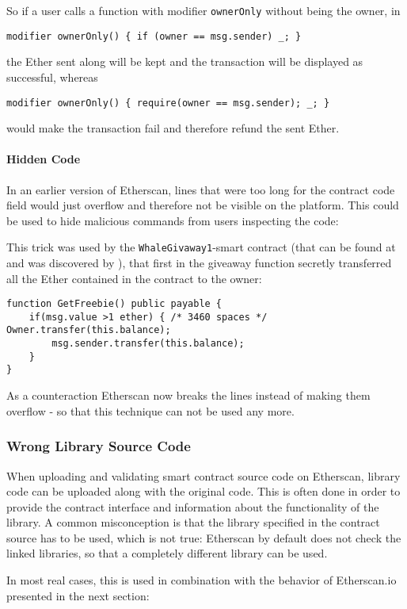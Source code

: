 So if a user calls a function with modifier \texttt{ownerOnly} without being the owner, in
\begin{verbatim}
modifier ownerOnly() { if (owner == msg.sender) _; }
\end{verbatim}
the Ether sent along will be kept and the transaction will be displayed as successful, whereas
\begin{verbatim}
modifier ownerOnly() { require(owner == msg.sender); _; }
\end{verbatim}
would make the transaction fail and therefore refund the sent Ether.

\paragraph{Hidden Code}
In an earlier version of Etherscan, lines that were too long for the contract code field would just overflow and therefore not be visible on the platform. This could be used to hide malicious commands from users inspecting the code:

This trick was used by the \texttt{WhaleGivaway1}-smart contract (that can be found at \cite{etherscan:whalegiveaway} and was discovered by \cite{wagner:honeypots}), that first in the giveaway function secretly transferred all the Ether contained in the contract to the owner:
\begin{verbatim}
function GetFreebie() public payable {
    if(msg.value >1 ether) { /* 3460 spaces */ Owner.transfer(this.balance);
        msg.sender.transfer(this.balance);
    }
}
\end{verbatim}

As a counteraction Etherscan now breaks the lines instead of making them overflow - so that this technique can not be used any more.

\subsubsection{Wrong Library Source Code}
When uploading and validating smart contract source code on Etherscan, library code can be uploaded along with the original code. This is often done in order to provide the contract interface and information about the functionality of the library. A common misconception is that the library specified in the contract source has to be used, which is not true: Etherscan by default does not check the linked libraries, so that a completely different library can be used.

In most real cases, this is used in combination with the behavior of Etherscan.io presented in the next section:

